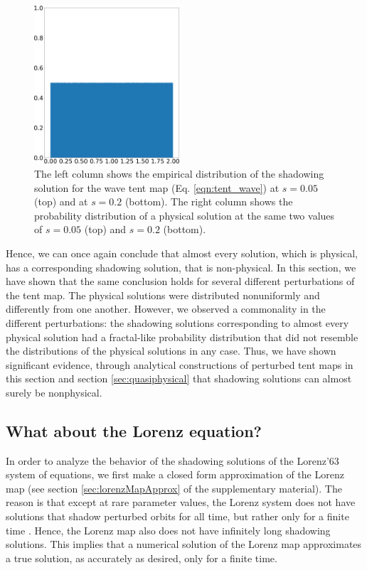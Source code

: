 \begin{figure}
    \hspace{0.02\textwidth}
    \includegraphics[width=0.48\textwidth]{figure/tent_wave_physical_density_0.2.png}
    \caption{The left column shows the empirical distribution of the shadowing solution for the wave tent map (Eq. \ref{eqn:tent_wave}) at $s=0.05$ (top) and at $s=0.2$ (bottom). The right column shows the probability distribution of a physical solution at the same two values of $s = 0.05$ (top) and $s = 0.2$ (bottom).}
    \label{fig:tent_wave_shadow}
\end{figure}
Hence, we can once again conclude that almost every solution, which is physical, 
has a corresponding shadowing solution, that is non-physical. In this section,
we have shown that the same conclusion holds for several different perturbations 
of the tent map. The physical solutions were distributed nonuniformly 
and differently from one another. However, we observed a commonality in the different perturbations: the shadowing solutions corresponding to almost every physical solution had a fractal-like probability distribution that did not resemble the distributions of the physical solutions in any case. Thus, we have shown significant evidence, through analytical constructions of perturbed tent maps in this section and 
section \ref{sec:quasiphysical} that shadowing solutions can almost surely be nonphysical.

\subsection{What about the Lorenz equation?}
In order to analyze the behavior of the shadowing solutions of the Lorenz'63 system 
of equations, we first make a closed form approximation of the Lorenz map (see section \ref{sec:lorenzMapApprox} of the supplementary material). The reason 
is that except at rare parameter values, the Lorenz system does not have 
solutions that shadow perturbed orbits for all time, but rather only for a finite time 
\cite{lorenzPOTP}. Hence, the Lorenz map also does not have infinitely long shadowing solutions. This implies that a numerical solution of the Lorenz map approximates 
a true solution, as accurately as desired, only for a finite time.

